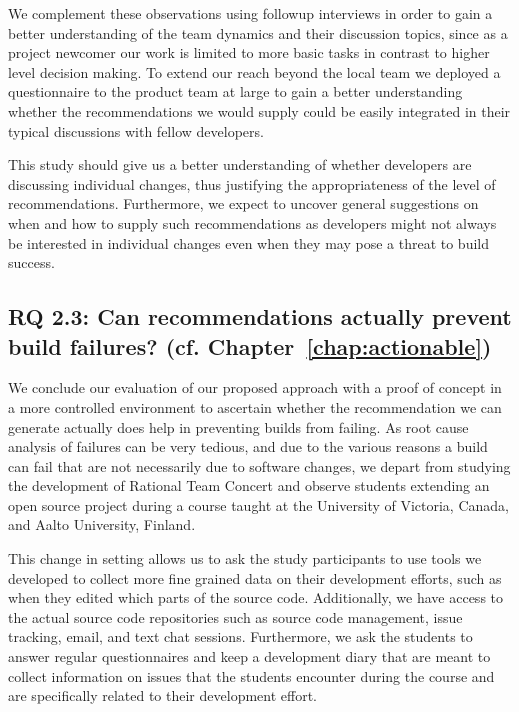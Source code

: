 We complement these observations using followup interviews in order to gain a better understanding of the team dynamics and their discussion topics, since as a project newcomer our work is limited to more basic tasks in contrast to higher level decision making.
To extend our reach beyond the local team we deployed a questionnaire to the product team at large to gain a better understanding whether the recommendations we would supply could be easily integrated in their typical discussions with fellow developers.

This study should give us a better understanding of whether developers are discussing individual changes, thus justifying the appropriateness of the level of recommendations.
Furthermore, we expect to uncover general suggestions on when and how to supply such recommendations as developers might not always be interested in individual changes even when they may pose a threat to build success.

\vspace{-5pt}
\subsection{%
  RQ 2.3: Can recommendations actually prevent build failures? (cf. Chapter~\ref{chap:actionable})}
\vspace{-7pt}
We conclude our evaluation of our proposed approach with  a proof of concept in a more controlled environment to ascertain whether the recommendation we can generate actually does help in preventing builds from failing.
As root cause analysis of failures can be very tedious, and due to the various reasons a build can fail that are not necessarily due to software changes, we depart from studying the development of Rational Team Concert and observe students extending an open source project during a course taught at the University of Victoria, Canada, and Aalto University, Finland.

This change in setting allows us to ask the study participants to use tools we developed to collect more fine grained data on their development efforts, such as when they edited which parts of the source code.
Additionally, we have access to the actual source code repositories such as source code management, issue tracking, email, and text chat sessions.
Furthermore, we ask the students to answer regular questionnaires and keep a development diary that are meant to collect information on issues that the students encounter during the course and are specifically related to their development effort.

